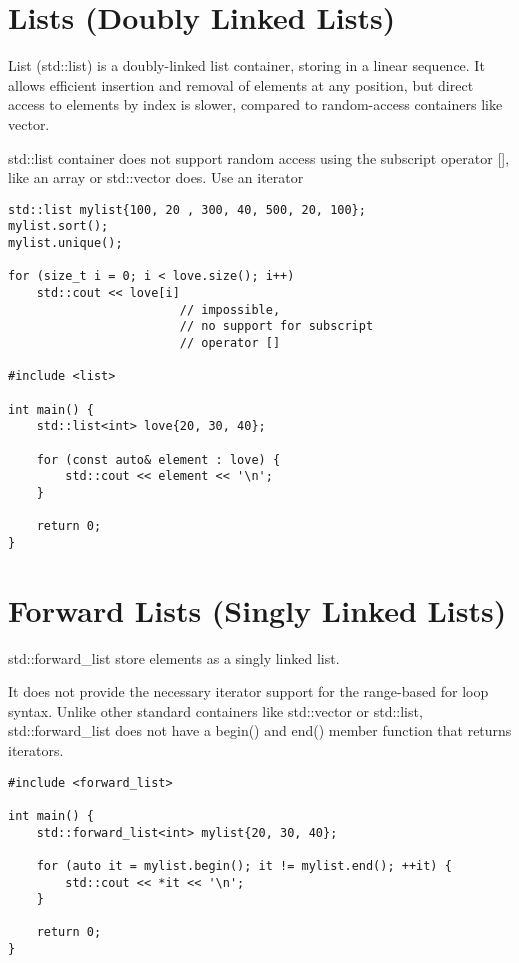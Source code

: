 \documentclass[openany]{report}
\begin{document}
\section{Lists (Doubly Linked Lists)}

List (std::list) is a doubly-linked list container, storing in a linear sequence. 
It allows efficient insertion and removal of elements at any position, 
but direct access to elements by index is slower,
compared to random-access containers like vector.

std::list container does not support random access using the subscript operator [],
like an array or std::vector does. Use an iterator

\begin{verbatim}
std::list mylist{100, 20 , 300, 40, 500, 20, 100};
mylist.sort();
mylist.unique();

for (size_t i = 0; i < love.size(); i++)
    std::cout << love[i] 
                        // impossible, 
                        // no support for subscript
                        // operator []

#include <list>

int main() {
    std::list<int> love{20, 30, 40};

    for (const auto& element : love) {
        std::cout << element << '\n';
    }

    return 0;
}
\end{verbatim}

\section{Forward Lists (Singly Linked Lists)}

std::forward\_list store elements as a singly linked list.

It does not provide the necessary iterator support for the range-based for loop syntax.
Unlike other standard containers like std::vector or std::list,
std::forward\_list does not have a begin() and end() member function that returns iterators.

\begin{verbatim}
#include <forward_list>

int main() {
    std::forward_list<int> mylist{20, 30, 40};

    for (auto it = mylist.begin(); it != mylist.end(); ++it) {
        std::cout << *it << '\n';
    }

    return 0;
}
\end{verbatim}
\end{document}
